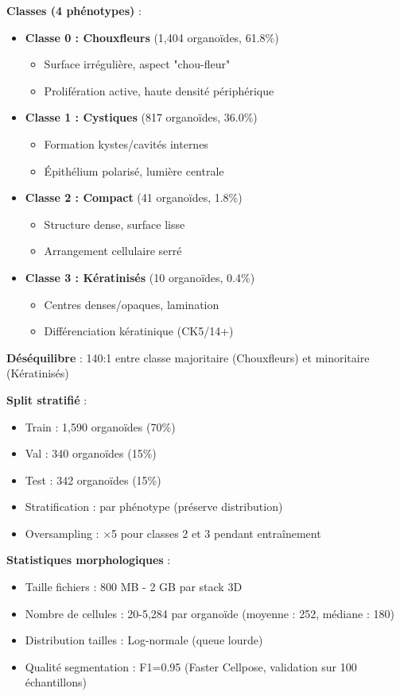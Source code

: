\textbf{Classes (4 phénotypes)} :
\begin{itemize}
    \item \textbf{Classe 0 : Chouxfleurs} (1,404 organoïdes, 61.8\%) 
    \begin{itemize}
        \item Surface irrégulière, aspect "chou-fleur"
        \item Prolifération active, haute densité périphérique
    \end{itemize}
    \item \textbf{Classe 1 : Cystiques} (817 organoïdes, 36.0\%)
    \begin{itemize}
        \item Formation kystes/cavités internes
        \item Épithélium polarisé, lumière centrale
    \end{itemize}
    \item \textbf{Classe 2 : Compact} (41 organoïdes, 1.8\%)
    \begin{itemize}
        \item Structure dense, surface lisse
        \item Arrangement cellulaire serré
    \end{itemize}
    \item \textbf{Classe 3 : Kératinisés} (10 organoïdes, 0.4\%)
    \begin{itemize}
        \item Centres denses/opaques, lamination
        \item Différenciation kératinique (CK5/14+)
    \end{itemize}
\end{itemize}

\textbf{Déséquilibre} : 140:1 entre classe majoritaire (Chouxfleurs) et minoritaire (Kératinisés)

\textbf{Split stratifié} :
\begin{itemize}
    \item Train : 1,590 organoïdes (70\%)
    \item Val : 340 organoïdes (15\%)
    \item Test : 342 organoïdes (15\%)
    \item Stratification : par phénotype (préserve distribution)
    \item Oversampling : ×5 pour classes 2 et 3 pendant entraînement
\end{itemize}

\textbf{Statistiques morphologiques} :
\begin{itemize}
    \item Taille fichiers : 800 MB - 2 GB par stack 3D
    \item Nombre de cellules : 20-5,284 par organoïde (moyenne : 252, médiane : 180)
    \item Distribution tailles : Log-normale (queue lourde)
    \item Qualité segmentation : F1=0.95 (Faster Cellpose, validation sur 100 échantillons)
\end{itemize}

